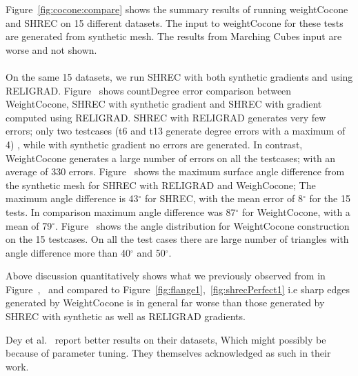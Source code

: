 Figure~\ref{fig:cocone:compare} shows the summary results of running weightCocone and SHREC on 15 different datasets. 
The input to weightCocone  for these tests are generated from synthetic mesh. The results from Marching Cubes input are worse and not shown.
\paragraph{}
On the same 15 datasets, we run SHREC with both synthetic gradients and using RELIGRAD.
Figure~\protect{} shows countDegree error comparison between WeightCocone, SHREC with synthetic gradient and SHREC with gradient computed using RELIGRAD.  SHREC with RELIGRAD generates very few errors; only two testcases (t6 and t13 generate degree errors with a maximum of 4) , while with synthetic gradient no errors are generated. 
In contrast, WeightCocone generates a large number of errors on all the testcases; with an average of 330 errors. Figure~\protect{} shows the maximum surface angle difference from the synthetic mesh for SHREC with RELIGRAD and WeighCocone;
The maximum angle difference is 43$^\circ$ for SHREC, with the mean error of 8$^\circ$ for the 15 tests. In comparison maximum angle difference was 87$^\circ$ for WeightCocone, with a mean of 79$^\circ$.
Figure~\protect{} shows the angle distribution for WeightCocone construction on the 15 testcases. 
On all the test cases there are large number of triangles with angle difference more than 40$^\circ$ and 50$^\circ$.

Above discussion quantitatively shows what we previously observed from  in Figure~\protect{},~\protect{} and compared to Figure~\ref{fig:flange1},~\ref{fig:shrecPerfect1} i.e sharp edges generated by WeightCocone is in general far worse than those generated by SHREC with synthetic as well as RELIGRAD gradients. 

Dey et al.~\cite{Dey2012,Dey2013} report better results on their datasets, Which might possibly be because of parameter tuning. They themselves acknowledged as such in their work.


